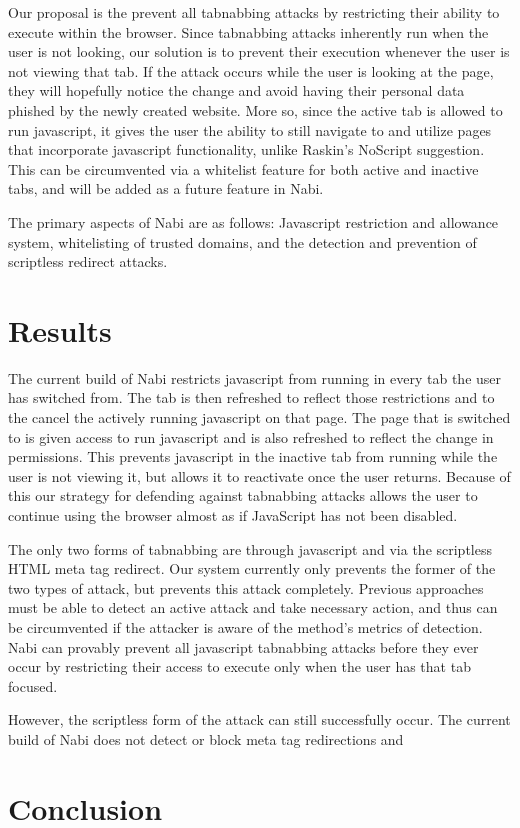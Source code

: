 \documentclass[12pt]{article}
\begin{document}
\begin{doublespace}
Our proposal is the prevent all tabnabbing attacks by restricting their ability to execute within the browser. Since tabnabbing attacks inherently run when the user is not looking, our solution is to prevent their execution whenever the user is not viewing that tab. If the attack occurs while the user is looking at the page, they will hopefully notice the change and avoid having their personal data phished by the newly created website. More so, since the active tab is allowed to run javascript, it gives the user the ability to still navigate to and utilize pages that incorporate javascript functionality, unlike Raskin's NoScript suggestion. This can be circumvented via a whitelist feature for both active and inactive tabs, and will be added as a future feature in Nabi.

The primary aspects of Nabi are as follows: Javascript restriction and allowance system, whitelisting of trusted domains, and the detection and prevention of scriptless redirect attacks. 

\section{Results}
The current build of Nabi restricts javascript from running in every tab the user has switched from. The tab is then refreshed to reflect those restrictions and to the cancel the actively running javascript on that page. The page that is switched to is given access to run javascript and is also refreshed to reflect the change in permissions. This prevents javascript in the inactive tab from running while the user is not viewing it, but allows it to reactivate once the user returns. Because of this our strategy for defending against tabnabbing attacks allows the user to continue using the browser almost as if JavaScript has not been disabled.

The only two forms of tabnabbing are through javascript and via the scriptless HTML meta tag redirect. Our system currently only prevents the former of the two types of attack, but prevents this attack completely. Previous approaches must be able to detect an active attack and take necessary action, and thus can be circumvented if the attacker is aware of the method's metrics of detection. Nabi can provably prevent all javascript tabnabbing attacks before they ever occur by restricting their access to execute only when the user has that tab focused.

However, the scriptless form of the attack can still successfully occur. The current build of Nabi does not detect or block meta tag redirections and 

\section{Conclusion}

\end{doublespace}




\end{document}
